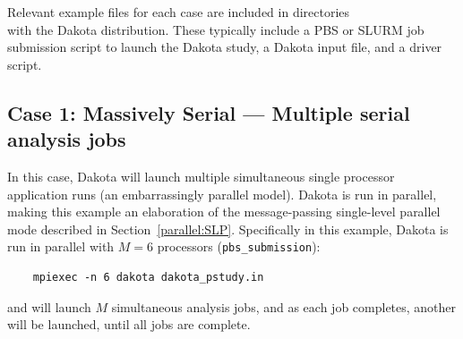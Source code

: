 Relevant example files for each case are included in directories\\  with the Dakota distribution.
These typically include a PBS or SLURM job submission script to launch
the Dakota study, a Dakota input file, and a driver script.

\subsection{Case 1: Massively Serial --- Multiple serial analysis jobs}

In this case, Dakota will launch multiple simultaneous single
processor application runs (an embarrassingly parallel model).  
Dakota is run in parallel, making this example an elaboration of the 
message-passing single-level parallel mode described in 
Section~\ref{parallel:SLP}.  Specifically in this example, Dakota 
is run in parallel with $M=6$ processors ({\tt pbs\_submission}):
\begin{verbatim}
    mpiexec -n 6 dakota dakota_pstudy.in
\end{verbatim}
and will launch $M$ simultaneous analysis jobs, and as each job 
completes, another will be launched, until all jobs are complete.
